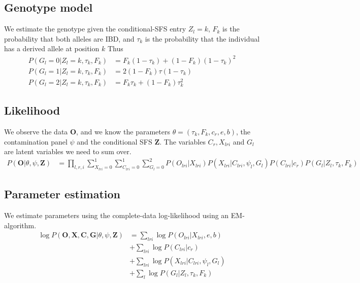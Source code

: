 \documentclass[10pt,a4paper]{article}
\begin{document}
\subsection*{Genotype model}
We estimate the genotype given the conditional-SFS entry $Z_l=k$, $F_k$ is the probability that both alleles are IBD, and $\tau_k$ is the probability that the individual has a derived allele at position $k$
Thus
\begin{align}
P(G_l = 0| Z_l=k, \tau_k, F_k) &= F_k (1-\tau_k) + (1-F_k) (1-\tau_k)^2\nonumber\\
P(G_l = 1| Z_l=k, \tau_k, F_k) &= 2(1-F_k) \tau(1-\tau_k)\nonumber\\
P(G_l = 2| Z_l=k, \tau_k, F_k) &= F_k \tau_k + (1-F_k) \tau_k^2
\end{align}

\subsection*{Likelihood}
We observe the data $\mathbf{O}$, and we know the parameters $\theta = (\tau_k, F_k, c_r, e,b)$, the 
contamination panel $\psi$ and the conditional SFS $\mathbf{Z}$. The variables
$C_r, X_{lri}$ and $G_l$ are latent variables we need to sum over.
\begin{align}
P(\mathbf{O} | \theta, \psi, \mathbf{Z}) &= 
\prod_{l, r, i}\sum_{X_{lri}=0}^1\sum_{C_{lri}=0}^1\sum_{G_{l}=0}^2 P(O_{lri} |X_{lri}) P(X_{lri} | C_{lri}, \psi_l, G_l) P(C_{lri} | c_r) P(G_l | Z_l, \tau_k, F_k)
\end{align}

\subsection*{Parameter estimation}
We estimate parameters using the complete-data log-likelihood using an EM-algorithm.
\begin{align*}
\log P(\mathbf{O}, \mathbf{X}, \mathbf{C}, \mathbf{G} | \theta, \psi, \mathbf{Z}) &= 
\sum_{lri} \log P(O_{lri} | X_{lri}, e, b)\\
&+ \sum_{lri}\log P(C_{lri} | c_r)\\
&+ \sum_{lri}\log P(X_{lri} | C_{lri}, \psi_l, G_l)\\
&+ \sum_{l} \log P( G_l | Z_l, \tau_k, F_k)
\end{align*}







\end{document}
